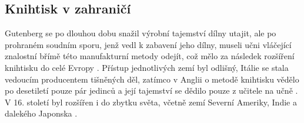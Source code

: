 \documentclass[10pt,a4paper]{article}
\begin{document}
\subsection*{Knihtisk v zahraničí}

Gutenberg se po dlouhou dobu snažil výrobní tajemství dílny utajit, ale po prohraném soudním sporu, jenž vedl k zabavení jeho dílny, museli učni vláčející znalostní břímě této manufakturní metody odejít, což mělo za následek rozšíření knihtisku do celé Evropy \cite{knihtisk}. Přístup jednotlivých zemí byl odlišný, Itálie se stala vedoucím producentem tišněných děl, zatímco v Anglii o metodě knihtisku vědělo po desetiletí pouze pár jedinců a její tajemství se dědilo pouze z učitele na učně \cite{eng}. V 16. století byl rozšířen i do zbytku světa, včetně zemí Severní Ameriky, Indie a dalekého Japonska \cite{knihtisk}.

\pagebreak


\end{document}
